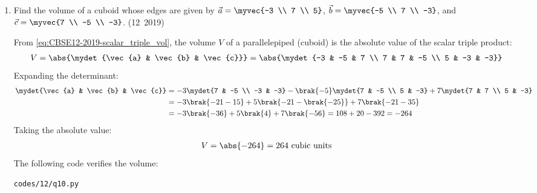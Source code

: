 \begin{enumerate}[label=\thesubsection.\arabic*, ref=\thesubsection.\theenumi]
\solution
Let $\theta$ be the angle between $\vec{a}$ and $\vec{b}$.
Evaluating the magnitude of $\vec{a} \times \vec{b}$:
\begin{align}
	\norm{\vec{a} \times \vec{b}} = \sqrt{3^2 + 2^2 + 6^2} = \sqrt{9 + 4 + 36} = \sqrt{49} = 7
\end{align}
From \eqref{eq:CBSE12-2019-cross_norm} and \eqref{eq:CBSE12-2019-sin_theta}:
\begin{align}
	\sin\theta = \frac{\norm{\vec{a} \times \vec{b}}}{\norm{\vec{a}}\norm{\vec{b}}} = \frac{7}{2 \times 7} = \frac{1}{2}
\end{align}
Since $\theta \in [0, \pi]$:
\begin{align}
	\theta = \frac{\pi}{6} \quad \text{or} \quad \theta = \frac{5\pi}{6}
\end{align}


\item Find the volume of a cuboid whose edges are given by $\vec{a} = \myvec{-3 \\ 7 \\ 5}$, $\vec{b} = \myvec{-5 \\ 7 \\ -3}$, and $\vec{c} = \myvec{7 \\ -5 \\ -3}$.
\hfill (12~2019)

\solution
From \eqref{eq:CBSE12-2019-scalar_triple_vol}, the volume $V$ of a parallelepiped (cuboid) is the absolute value of the scalar triple product:
\begin{align}
	V = \abs{\mydet{\vec{a} & \vec{b} & \vec{c}}} = \abs{\mydet{-3 & -5 & 7 \\ 7 & 7 & -5 \\ 5 & -3 & -3}}
\end{align}
Expanding the determinant:
\begin{align}
	\mydet{\vec{a} & \vec{b} & \vec{c}} &= -3\mydet{7 & -5 \\ -3 & -3} - \brak{-5}\mydet{7 & -5 \\ 5 & -3} + 7\mydet{7 & 7 \\ 5 & -3} \\
	&= -3\brak{-21 - 15} + 5\brak{-21 - \brak{-25}} + 7\brak{-21 - 35} \\
	&= -3\brak{-36} + 5\brak{4} + 7\brak{-56} = 108 + 20 - 392 = -264
\end{align}
Taking the absolute value:
\begin{align}
	V = \abs{-264} = 264\text{ cubic units}
\end{align}
The following code verifies the volume:
\begin{lstlisting}[frame=single, basicstyle=\ttfamily\small]
	codes/12/q10.py
\end{lstlisting}



\end{enumerate}
